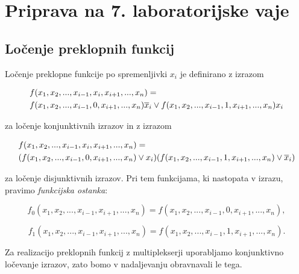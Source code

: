 \chapter{Priprava na 7. laboratorijske vaje}
\section{Ločenje preklopnih funkcij}

Ločenje preklopne funkcije po spremenljivki $x_i$ je definirano z izrazom

\begin{align*}
&f(x_1, x_2,..., x_{i-1}, x_i, x_{i+1},..., x_n) = \\ &f(x_1, x_2,..., x_{i-1}, 0, x_{i+1},..., x_n) \overline x_i \vee f(x_1, x_2,..., x_{i-1}, 1, x_{i+1},..., x_n) x_i 
\end{align*}

za ločenje konjunktivnih izrazov in z izrazom

\begin{align*}
&f(x_1, x_2,..., x_{i-1}, x_i, x_{i+1},..., x_n) = \\ &(f(x_1, x_2,..., x_{i-1}, 0, x_{i+1},..., x_n) \vee x_i) (f(x_1, x_2,..., x_{i-1}, 1, x_{i+1},..., x_n) \vee \overline x_i) 
\end{align*}

za ločenje disjunktivnih izrazov. Pri tem funkcijama, ki nastopata v izrazu, pravimo \emph{funkcijska ostanka}:

$$
f_0(x_1, x_2,..., x_{i-1}, x_{i+1},..., x_n) = f(x_1, x_2,..., x_{i-1}, 0, x_{i+1},..., x_n),
$$

$$
f_1(x_1, x_2,..., x_{i-1}, x_{i+1},..., x_n) = f(x_1, x_2,..., x_{i-1}, 1, x_{i+1},..., x_n).
$$

Za realizacijo preklopnih funkcij z multiplekserji uporabljamo konjunktivno ločevanje izrazov, zato bomo
v nadaljevanju obravnavali le tega.

